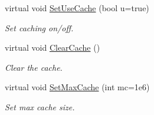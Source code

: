 \begin{DoxyCompactItemize}
virtual void \hyperlink{classOscProb_1_1PMNS__Base_aa94c1e1fff0ba731c75f7e633b023a9f}{Set\+Use\+Cache} (bool u=true)
\begin{DoxyCompactList}\small\item\em Set caching on/off. \end{DoxyCompactList}\item 
virtual void \hyperlink{classOscProb_1_1PMNS__Base_ac47fd33e69aa6490f99e2fd147a92f03}{Clear\+Cache} ()
\begin{DoxyCompactList}\small\item\em Clear the cache. \end{DoxyCompactList}\item 
virtual void \hyperlink{classOscProb_1_1PMNS__Base_ae67862cf58b0802487a14b047b012a78}{Set\+Max\+Cache} (int mc=1e6)
\begin{DoxyCompactList}\small\item\em Set max cache size. \end{DoxyCompactList}\end{DoxyCompactItemize}
